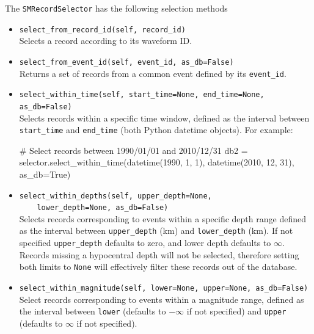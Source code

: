 The \verb=SMRecordSelector= has the following selection methods
\begin{itemize}
\item \verb;select_from_record_id(self, record_id);\\

Selects a record according to its waveform ID.

\item \verb;select_from_event_id(self, event_id, as_db=False);\\

Returns a set of records from a common event defined by its \verb=event_id=.

\item \verb;select_within_time(self, start_time=None, end_time=None, as_db=False);\\

Selects records within a specific time window, defined as the interval between \verb=start_time= and \verb=end_time= (both Python datetime objects). For example:

\begin{python}
# Select records between 1990/01/01 and 2010/12/31
db2 = selector.select_within_time(datetime(1990, 1, 1),
                                  datetime(2010, 12, 31),
                                  as_db=True)
\end{python}

\item \verb;select_within_depths(self, upper_depth=None,;\\
\verb;    lower_depth=None, as_db=False);\\

Selects records corresponding to events within a specific depth range defined as the interval between \verb=upper_depth= (km) and \verb=lower_depth= (km). If not specified \verb=upper_depth= defaults to zero, and lower depth defaults to $\infty$. Records missing a hypocentral depth will not be selected, therefore setting both limits to \verb=None= will effectively filter these records out of the database.

\item \verb;select_within_magnitude(self, lower=None, upper=None, as_db=False);\\

Select records corresponding to events within a magnitude range, defined as the interval between \verb=lower= (defaults to $-\infty$ if not specified) and \verb=upper= (defaults to $\infty$ if not specified).


\end{itemize}
